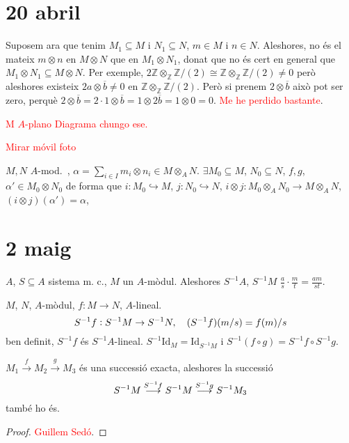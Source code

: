 \documentclass[../main.tex]{subfiles}
\begin{document}
\section{20 abril}



Suposem ara que tenim $M_1\subseteq M$ i $N_1\subseteq N$, $m\in M$ i $n\in N$. Aleshores, no és el mateix $m\otimes n$ en $M\otimes N$ que en $M_1\otimes N_1$, donat que no és cert en general que $M_1\otimes N_1\subseteq M\otimes N$. Per exemple, $2\mathbb{Z}\otimes_\mathbb{Z}\mathbb{Z}/(2)\cong \mathbb{Z}\otimes_\mathbb{Z}\mathbb{Z}/(2)\not=0$ però aleshores existeix $2a\otimes\overline{b}\not=0$ en $\mathbb{Z}\otimes_\mathbb{Z}\mathbb{Z}/(2)$. Però si prenem $2\otimes\overline{b}$ això pot ser zero, perquè $2\otimes \overline{b} = 2\cdotp1\otimes\overline{b} = 1\otimes 2\overline{b} = 1\otimes 0 = 0$. \textcolor{red}{Me he perdido bastante}. 

\textcolor{red}{M $A$-plano} \textcolor{red}{Diagrama chungo ese.}

\textcolor{red}{Mirar móvil foto}

\begin{lema}
$M,N$ $A$-mod.~, $\alpha = \sum_{i\in I}m_i\otimes n_i\in M\otimes_AN$. $\exists M_0\subseteq M$, $N_0\subseteq N$, $f,g$, $\alpha'\in M_0\otimes N_0$ de forma que $i:M_0\hookrightarrow M$, $j:N_0\hookrightarrow N$, $i\otimes j:M_0\otimes_AN_0\to M\otimes_AN$, $(i\otimes j)(\alpha') = \alpha$, 
\end{lema}


\section{2 maig}

$A$, $S\subseteq A$ sistema m. c., $M$ un $A$-mòdul. Aleshores $S^{-1}A$, $S^{-1}M$ $\frac{a}{s}\cdotp\frac{m}{t} = \frac{am}{st}$.

$M$, $N$, $A$-mòdul, $f: M \to N$, $A$-lineal.
\begin{equation}
    \notag
    S^{-1}f:S^{-1}M\to S^{-1}N,\quad (S^{-1}f)(m/s) = f(m)/s
\end{equation}
ben definit, $S^{-1}f$ és $S^{-1}A$-lineal. $S^{-1}\mathrm{Id}_M = \mathrm{Id}_{S^{-1}M}$ i $S^{-1}(f\circ g) = S^{-1}f\circ S^{-1}g$.

\begin{prop}
$M_1\overset{f}{\to}M_2\overset{g}{\to}M_3$ és una successió exacta, aleshores la successió
\begin{equation}
    \notag
    S^{-1}M\overset{S^{-1}f}{\longrightarrow}S^{-1}M\overset{S^{-1}g}{\longrightarrow} S^{-1}M_3
\end{equation}
també ho és.
\end{prop}
\begin{proof}
\textcolor{red}{Guillem Sedó}.
\end{proof}
\end{document}
